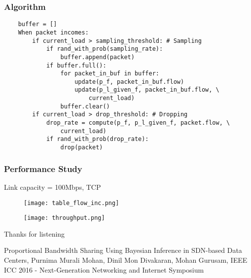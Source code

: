 \documentclass{beamer}
\begin{document}
\begin{frame}[fragile]
    \frametitle{Algorithm}
    \small
    \begin{verbatim}
    buffer = []
    When packet incomes:
        if current_load > sampling_threshold: # Sampling
            if rand_with_prob(sampling_rate):
                buffer.append(packet)
            if buffer.full():
                for packet_in_buf in buffer:
                    update(p_f, packet_in_buf.flow)
                    update(p_l_given_f, packet_in_buf.flow, \
                        current_load)
                buffer.clear()
        if current_load > drop_threshold: # Dropping
            drop_rate = compute(p_f, p_l_given_f, packet.flow, \
                current_load)
            if rand_with_prob(drop_rate):
                drop(packet)
    \end{verbatim}
\end{frame}

\begin{frame}
    \frametitle{Performance Study}
    Link capacity = 100Mbps, TCP
    \begin{figure}
        \centering
        \texttt{[image: table\_flow\_inc.png]}
    \end{figure}
    \begin{figure}
        \centering
        \texttt{[image: throughput.png]}
    \end{figure}
\end{frame}

\begin{frame}[standout]
Thanks for listening

\begin{scriptsize}
Proportional Bandwidth Sharing Using Bayesian Inference in SDN-based Data Centers,
Purnima Murali Mohan, Dinil Mon Divakaran, Mohan Gurusam, IEEE ICC 2016 - Next-Generation Networking and Internet Symposium
    
\end{scriptsize}
\end{frame}
\end{document}
